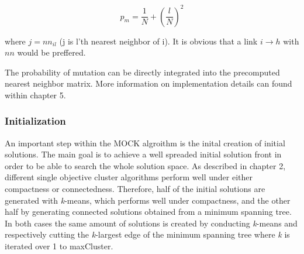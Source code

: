 \documentclass[parskip=half,DIV=14]{scrartcl}\usepackage[]{graphicx}\usepackage[]{color}
\begin{document}
\begin{displaymath}
p_m = \frac{1}{N} + (\frac{l}{N})^2
\end{displaymath}

where $j = nn_{il}$ (j is l'th nearest neighbor of i). It is obvious that a link $i\rightarrow h$ with $nn$ would be preffered.

The probability of mutation can be directly integrated into the precomputed nearest neighbor matrix. More information on implementation details can found within chapter 5.

\subsubsection{Initialization}
An important step within the MOCK algroithm is the inital creation of initial solutions. The main goal is to achieve a well spreaded initial solution front in order to be able to search the whole solution space. As described in chapter 2, different single objective cluster algorithms perform well under either compactness or connectedness. Therefore, half of the initial solutions are generated with \textit{k}-means, which performs well
under compactness, and the other half by generating connected solutions obtained from a minimum spanning tree. In both cases the same amount of solutions is created by conducting \textit{k}-means and respectively cutting the \textit{k}-largest edge of the minimum spanning tree where \textit{k} is iterated over 1 to maxCluster.
\end{document}
